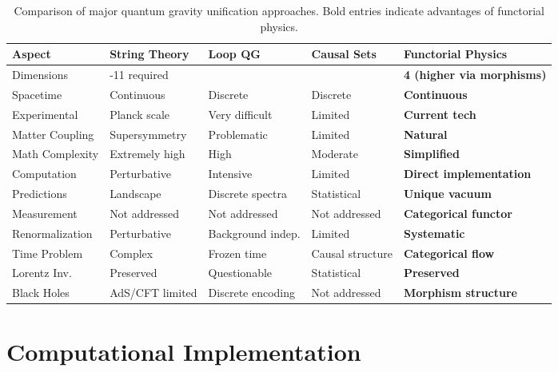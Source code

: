 \documentclass[11pt,a4paper]{article}
\begin{document}
\begin{table}[h!]
\centering
\footnotesize
\begin{tabular}{>{\raggedright\arraybackslash}p{2.2cm}|>{\centering\arraybackslash}p{2.2cm}|>{\centering\arraybackslash}p{2.2cm}|>{\centering\arraybackslash}p{2.2cm}|>{\centering\arraybackslash}p{2.4cm}}
\toprule
\textbf{Aspect} & \textbf{String Theory} & \textbf{Loop QG} & \textbf{Causal Sets} & \textbf{Functorial Physics} \\
\midrule
Dimensions & 10-11 required & 4 & 4 & \textbf{4 (higher via morphisms)} \\
\midrule
Spacetime & Continuous & Discrete & Discrete & \textbf{Continuous} \\
\midrule
Experimental & Planck scale & Very difficult & Limited & \textbf{Current tech} \\
\midrule
Matter Coupling & Supersymmetry & Problematic & Limited & \textbf{Natural} \\
\midrule
Math Complexity & Extremely high & High & Moderate & \textbf{Simplified} \\
\midrule
Computation & Perturbative & Intensive & Limited & \textbf{Direct implementation} \\
\midrule
Predictions & Landscape & Discrete spectra & Statistical & \textbf{Unique vacuum} \\
\midrule
Measurement & Not addressed & Not addressed & Not addressed & \textbf{Categorical functor} \\
\midrule
Renormalization & Perturbative & Background indep. & Limited & \textbf{Systematic} \\
\midrule
Time Problem & Complex & Frozen time & Causal structure & \textbf{Categorical flow} \\
\midrule
Lorentz Inv. & Preserved & Questionable & Statistical & \textbf{Preserved} \\
\midrule
Black Holes & AdS/CFT limited & Discrete encoding & Not addressed & \textbf{Morphism structure} \\
\bottomrule
\end{tabular}
\caption{Comparison of major quantum gravity unification approaches. Bold entries indicate advantages of functorial physics.}
\label{tab:comparison}
\end{table}

\section{Computational Implementation}
\end{document}
